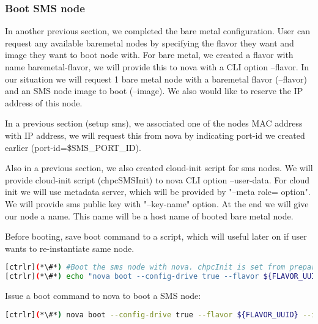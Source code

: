 \subsubsection{Boot SMS node}

	In another previous section, we completed the bare metal configuration. User can request any available baremetal nodes by specifying the flavor they want and image they want to boot node with. For bare metal, we created a flavor with name baremetal-flavor, we will provide this to nova with a CLI option --flavor. In our situation we will request 1 bare metal node with a baremetal flavor (--flavor) and an SMS node image to boot (--image).  We also would like to reserve the IP address of this node. 

	In a previous section (setup sms), we associated one of the nodes MAC address with IP address, we will request this from nova by indicating port-id we created earlier (port-id=\${SMS\_PORT\_ID}). 

	Also in a previous section, we also created cloud-init script for sms nodes. We will provide cloud-init script (chpcSMSInit) to nova CLI option --user-data. For cloud init we will use metadata server, which will be provided by "--meta role= option". We will provide sms public key with "--key-name" option. At the end we will give our node a name. This name will be a host name of booted bare metal node.

	Before booting, save boot command to a script, which will useful later on if user wants to re-instantiate same node.


\begin{lstlisting}[language=bash,keywords={}]
[ctrlr](*\#*) #Boot the sms node with nova. chpcInit is set from prepare_cloudInit
[ctrlr](*\#*) echo "nova boot --config-drive true --flavor ${FLAVOR_UUID} --image ${SMS_DISK_IMAGE_UUID} --key-name ${KEYPAIR_NAME} --meta role=webservers --user-data=$chpcSMSInit --nic port-id=${SMS_PORT_ID} ${sms_name}" > boot_sms
\end{lstlisting} 

	Issue a boot command to nova to boot a SMS node:


\begin{lstlisting}[language=bash,keywords={}]
[ctrlr](*\#*) nova boot --config-drive true --flavor ${FLAVOR_UUID} --image ${SMS_DISK_IMAGE_UUID} --key-name ${KEYPAIR_NAME} --meta role=webservers --user-data=$chpcSMSInit --nic port-id=${SMS_PORT_ID} ${sms_name}
\end{lstlisting} 

